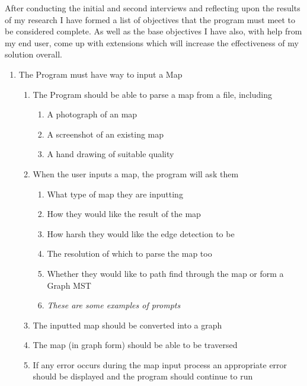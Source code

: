 \begin{flushleft}
        After conducting the initial and second interviews and reflecting upon the results of my research I have formed a list of objectives that the program must meet to be considered 
        complete. As well as the base objectives I have also, with help from my end user, come up with extensions which will increase the effectiveness of my solution overall. \\
        \bk
        
        \renewcommand{\labelenumii}{\arabic{enumi}.\arabic{enumii}}
        \renewcommand{\labelenumiii}{\arabic{enumi}.\arabic{enumii}.\arabic{enumiii}}
        \renewcommand{\labelenumiv}{\arabic{enumi}.\arabic{enumii}.\arabic{enumiii}.\arabic{enumiv}}
        
        \begin{enumerate}
            \item The Program must have way to input a Map
            \begin{enumerate}
                \item The Program should be able to parse a map from a file, including
                \begin{enumerate}
                    \item A photograph of an map
                    \item A screenshot of an existing map
                    \item A hand drawing of suitable quality
                \end{enumerate}
                \item When the user inputs a map, the program will ask them
                \begin{enumerate}
                    \item What type of map they are inputting
                    \item How they would like the result of the map
                    \item How harsh they would like the edge detection to be
                    \item The resolution of which to parse the map too
                    \item Whether they would like to path find through the map or form a Graph MST
                    \item \emph{These are some examples of prompts}
                \end{enumerate}
                \item The inputted map should be converted into a graph
                \item The map (in graph form) should be able to be traversed
                \item If any error occurs during the map input process an appropriate error should be displayed and the program should continue to run
            \end{enumerate}
            

\end{enumerate}
\end{flushleft}
